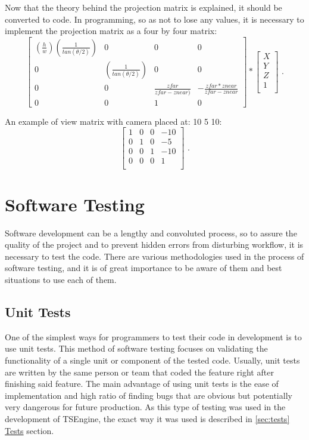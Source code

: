 Now that the theory behind the projection matrix is explained, it should be converted to code. In programming, so as not to lose any values, it is necessary to implement the projection matrix as a four by four matrix: 
\begin{equation}
\begin{bmatrix}
(\frac{h}{w})(\frac{1}{tan(\theta/2)}) & 0 & 0 & 0\\
0 & (\frac{1}{tan(\theta/2)}) & 0 & 0\\
0 & 0 & \frac{zfar}{zfar - znear)} & -\frac{zfar * znear}{zfar-znear}\\
0 & 0 & 1 & 0
\end{bmatrix} 
*
\begin{bmatrix}
X\\
Y\\
Z\\
1\\
\end{bmatrix} 
\text{ .}
\label{projectionmatrixequation}
\end{equation} 


An example of view matrix with camera placed at: 10 5 10:
\[
\begin{bmatrix}
1 & 0 & 0 & -10\\
0 & 1 & 0 & -5\\
0 & 0 & 1 & -10\\
0 & 0 & 0 & 1\\
\end{bmatrix} 
\text{ .}
\]

\newpage
\section{Software Testing}
\label{sec:testing}
\hspace{\parindent}
Software development can be a lengthy and convoluted process, so to assure the quality of the project and to prevent hidden errors from disturbing workflow, it is necessary to test the code. There are various methodologies used in the process of software testing, and it is of great importance to be aware of them and best situations to use each of them.
\subsection{Unit Tests}
\hspace{\parindent}
One of the simplest ways for programmers to test their code in development is to use unit tests. This method of software testing focuses on validating the functionality of a single unit or component of the tested code. Usually, unit tests are written by the same person or team that coded the feature right after finishing said feature. The main advantage of using unit tests is the ease of implementation and high ratio of finding bugs that are obvious but potentially very dangerous for future production. As this type of testing was used in the development of TSEngine, the exact way it was used is described in \hyperref[sec:tests]{\ref*{sec:tests} Tests} section.

